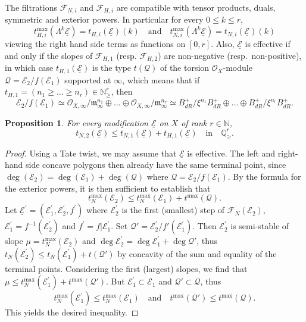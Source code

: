 \documentclass[11pt]{article}
\newtheorem{prop}[theo]{Proposition}
\theoremstyle{definition}
\numberwithin{equation}{section}
\numberwithin{figure}{section}
\numberwithin{table}{section}
\newcommand*{\dR}{dR}
\begin{document}
The filtrations $\mathcal{F}_{N,i}$ and $\mathcal{F}_{H,i}$ are compatible with tensor products, duals, symmetric and exterior powers. In particular for every $0\leq k\leq r$,
\[
t_{H,i}^{\max}(\Lambda^{k}\underline{\mathcal{E}})=t_{H,i}(\underline{\mathcal{E}})(k)\quad\text{and}\quad t_{N,i}^{\max}(\Lambda^{k}\underline{\mathcal{E}})=t_{N,i}(\underline{\mathcal{E}})(k)
\]
viewing the right hand side terms as functions on $[0,r]$. Also, $\underline{\mathcal{E}}$ is effective if and only if the slopes of $\mathcal{F}_{H,1}$ (resp. $\mathcal{F}_{H,2}$) are non-negative (resp.~non-positive), in which case $t_{H,1}(\underline{\mathcal{E}})$ is the type $t(\mathcal{Q})$ of the torsion $\mathcal{O}_{X}$-module $\mathcal{Q}=\mathcal{E}_{2}/f(\mathcal{E}_{1})$ supported at $\infty$, which means that if $t_{H,1}=(n_{1}\geq\dots\geq n_{r})\in\mathbb{N}_{\geq}^{r}$, then
\[
\mathcal{E}_{2}/f(\mathcal{E}_{1})\simeq\mathcal{O}_{X,\infty}/\mathfrak{m}_{\infty}^{n_{1}}\oplus\dots\oplus\mathcal{O}_{X,\infty}/\mathfrak{m}_{\infty}^{n_{r}}\simeq B_{\dR}^{+}/\xi^{n_{1}}B_{\dR}^{+}\oplus\dots\oplus B_{\dR}^{+}/\xi^{n_{r}}B_{\dR}^{+}.
\]

\begin{prop}\label{prop:CompNewtonHodgeModif}
For every modification $\underline{\mathcal{E}}$ on $X$ of rank $r\in\mathbb{N}$,
\[
t_{N,2}(\underline{\mathcal{E}})\leq t_{N,1}(\underline{\mathcal{E}})+t_{H,1}(\underline{\mathcal{E}})\quad\text{in}\quad\mathbb{Q}_{\geq}^{r}.
\]
\end{prop}

\begin{proof}
Using a Tate twist, we may assume that $\underline{\mathcal{E}}$ is effective. The left and right-hand side concave polygons then already have the same terminal point, since $\deg(\mathcal{E}_{2})=\deg(\mathcal{E}_{1})+\deg(\mathcal{Q})$ where $\mathcal{Q}=\mathcal{E}_{2}/f(\mathcal{E}_{1})$. By the formula for the exterior powers, it is then sufficient to establish that
\[
t_{N}^{\max}(\mathcal{E}_{2})\leq t_{N}^{\max}(\mathcal{E}_{1})+t^{\max}(\mathcal{Q}).
\]
Let $\underline{\mathcal{E}}^{\prime}=(\mathcal{E}_{1}^{\prime},\mathcal{E}_{2}^{\prime},f^{\prime})$ where $\mathcal{E}_{2}^{\prime}$ is the first (smallest) step of $\mathcal{F}_{N}(\mathcal{E}_{2})$, $\mathcal{E}_{1}^{\prime}=f^{-1}(\mathcal{E}_{2}^{\prime})$ and $f^{\prime}=f\vert\mathcal{E}_{1}^{\prime}$. Set $\mathcal{Q}'=\mathcal{E}_{2}^{\prime}/f'(\mathcal{E}_{1}^{\prime})$. Then $\mathcal{E}_{2}^{\prime}$ is semi-stable of slope $\mu=t_{N}^{\max}(\mathcal{E}_{2})$ and $\deg\mathcal{E}_{2}^{\prime}=\deg\mathcal{E}_{1}^{\prime}+\deg\mathcal{Q}'$, thus $t_{N}(\mathcal{E}_{2}^{\prime})\leq t_{N}(\mathcal{E}_{1}^{\prime})+t(\mathcal{Q}')$ by concavity of the sum and equality of the terminal points. Considering the first (largest) slopes, we find that $\mu\leq t_{N}^{\max}(\mathcal{E}_{1}^{\prime})+t^{\max}(\mathcal{Q}')$. But $\mathcal{E}_{1}^{\prime}\subset\mathcal{E}_{1}$ and $\mathcal{Q}'\subset\mathcal{Q}$, thus
\[
t_{N}^{\max}(\mathcal{E}_{1}^{\prime})\leq t_{N}^{\max}(\mathcal{E}_{1})\quad\text{and}\quad t^{\max}(\mathcal{Q}')\leq t^{\max}(\mathcal{Q}).
\]
This yields the desired inequality.
\end{proof}
\end{document}
